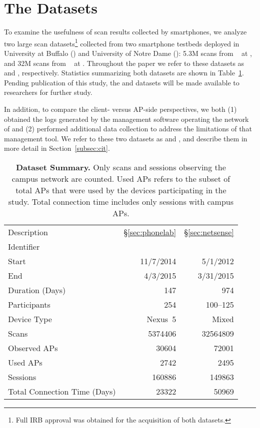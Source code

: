 \section{The Datasets}
\label{sec:dataset}

To examine the usefulness of \wifi{} scan results collected by smartphones, we
analyze two large scan datasets\footnote{Full IRB approval was obtained for the
acquisition of both datasets.} collected from two smartphone testbeds deployed
in University at Buffalo (\ub{}) and University of Notre Dame (\nd{}): 5.3M scans from
\PhoneLab{}~\cite{nandugudi2013phonelab} at \ub{}, and 32M scans from
\NetSense{}~\cite{striegel2013lessons} at \nd{}.  Throughout the paper we refer
to these datasets as \textbf{\ubscan{}} and \textbf{\ndscan{}}, respectively.
Statistics summarizing both datasets are shown in Table~\ref{tab:stats}. Pending
publication of this study, the \ubscan{} and \ndscan{} datasets will be made
available to researchers for further study.

In addition, to compare the client- versus AP-side perspectives, we
both (1) obtained the logs generated by the management software
operating the \wifi{} network of \ub{} and (2) performed additional data collection
to address the limitations of that management tool. We refer to these two
datasets as \textbf{\ubap{}} and \textbf{\ubapdetail{}}, and describe them in
more detail in Section~\ref{subsec:cit}.

\begin{table}[t]
  {\small
  \begin{tabularx}{\columnwidth}{Xrr}
    & \PhoneLab{} & \NetSense{}\\\midrule
    Description & \S\ref{sec:phonelab} & \S\ref{sec:netsense} \\
    Identifier & \ubscan{} & \ndscan{} \\ 
    Start & 11/7/2014 & 5/1/2012 \\ 
    End & 4/3/2015 & 3/31/2015 \\ 
    Duration (Days) & 147 & 974 \\ \midrule
    Participants & 254 & 100--125 \\
    Device Type & Nexus~5 & Mixed \\ \midrule
    Scans & \num{5374406} & \num{32564809} \\
    Observed APs & \num{30604} & \num{72001} \\
    Used APs & \num{2742} & \num{2495}\\ \midrule
    \wifi{} Sessions & \num{160886} & \num{149863} \\
    Total Connection Time (Days) & \num{23322} & \num{50969} 
  \end{tabularx}
  \caption{\textbf{Dataset Summary.} Only \wifi{} scans and sessions
  observing the campus network are counted. Used APs refers to the subset of
  total APs that were used by the devices participating in the study. Total
connection time includes only \wifi{} sessions with campus APs.}
  \label{tab:stats}
  \vspace*{\aftercaptiongap}
}
\end{table}


